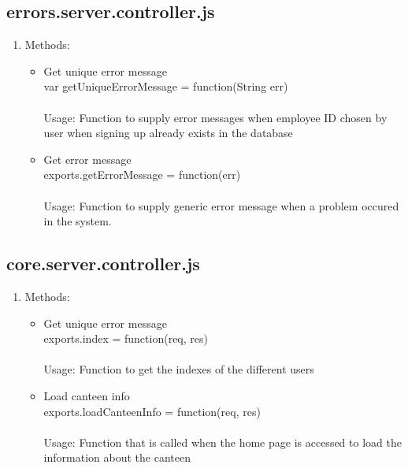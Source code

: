 \documentclass[a4paper,12pt]{article}
\begin{document}
\subsection{errors.server.controller.js}
\begin{enumerate}
	\item Methods:
	\begin{itemize}
		\item Get unique error message \\ var getUniqueErrorMessage = function(String err) \\ \\
		Usage: Function to supply error messages when employee ID chosen by user when signing up already exists in the database
		\item Get error message \\ exports.getErrorMessage = function(err) 
		\\ \\ Usage: Function to supply generic error message when a problem occured in the system.
	\end{itemize}
\end{enumerate}

\subsection{core.server.controller.js}
\begin{enumerate}
	\item Methods:
	\begin{itemize}
		\item Get unique error message \\ exports.index = function(req, res) 
		\\ \\ Usage: Function to get the indexes of the different users 
		\item Load canteen info \\ exports.loadCanteenInfo = function(req, res)
		\\ \\ Usage: Function that is called when the home page is accessed to load the information about the canteen
	\end{itemize}
\end{enumerate}
\end{document}
